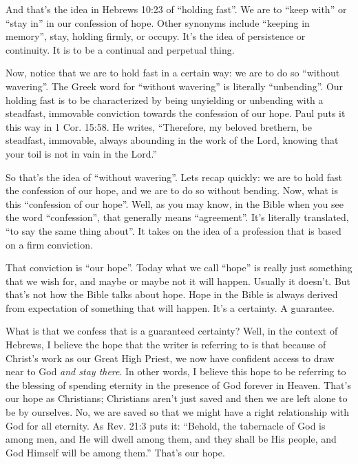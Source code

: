\documentclass[letterpaper, 12pt]{article}
\begin{document}
    And that's the idea in Hebrews 10:23 of ``holding fast''. We are to
    ``keep with'' or ``stay in'' in our confession of hope. Other
    synonyms include ``keeping in memory'', stay, holding firmly, or
    occupy. It's the idea of persistence or continuity. It is to be a
    continual and perpetual thing.

    Now, notice that we are to hold fast in a certain way: we are to do
    so ``without wavering''. The Greek word for ``without wavering'' is
    literally ``unbending''. Our holding fast is to be characterized by
    being unyielding or unbending with a steadfast, immovable conviction
    towards the confession of our hope. Paul puts it this way in 1 Cor.
    15:58. He writes, ``Therefore, my beloved brethern, be steadfast,
    immovable, always abounding in the work of the Lord, knowing that
    your toil is not in vain in the Lord.''

    So that's the idea of ``without wavering''. Lets recap quickly: we
    are to hold fast the confession of our hope, and we are to do so
    without bending.  Now, what is this ``confession of our hope''.
    Well, as you may know, in the Bible when you see the word
    ``confession'', that generally means ``agreement''. It's literally
    translated, ``to say the same thing about''. It takes on the idea of
    a profession that is based on a firm conviction. 

    That conviction is ``our hope''. Today what we call ``hope'' is
    really just something that we wish for, and maybe or maybe not it
    will happen. Usually it doesn't. But that's not how the Bible talks
    about hope. Hope in the Bible is always derived from expectation of
    something that will happen. It's a certainty. A guarantee. 

    What is that we confess that is a guaranteed certainty? Well, in the
    context of Hebrews, I believe the hope that the writer is referring
    to is that because of Christ's work as our Great High Priest, we now
    have confident access to draw near to God \emph{and stay there}. In
    other words, I believe this hope to be referring to the blessing of
    spending eternity in the presence of God forever in Heaven. That's
    our hope as Christians; Christians aren't just saved and then we are
    left alone to be by ourselves. No, we are saved so that we might
    have a right relationship with God for all eternity. As Rev. 21:3
    puts it: ``Behold, the tabernacle of God is among men, and He will
    dwell among them, and they shall be His people, and God Himself will
    be among them.'' That's our hope.
\end{document}
